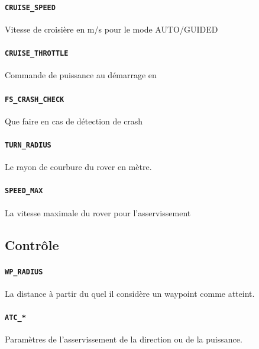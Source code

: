 \documentclass[a4paper, 10pt]{report}
\begin{document}
		\paragraph*{\texttt{CRUISE\_SPEED}} Vitesse de croisière en m/s pour le mode AUTO/GUIDED
		\paragraph*{\texttt{CRUISE\_THROTTLE}} Commande de puissance au démarrage en %
		\paragraph*{\texttt{FS\_CRASH\_CHECK}} Que faire en cas de détection de crash
		\paragraph*{\texttt{TURN\_RADIUS}}	Le rayon de courbure du rover en mètre.
		\paragraph*{\texttt{SPEED\_MAX}}	La vitesse maximale du rover pour l'asservissement
	\subsection{Contrôle}
		\paragraph*{\texttt{WP\_RADIUS}} La distance à partir du quel il considère un waypoint comme atteint.
		\paragraph*{\texttt{ATC\_*}}	Paramètres de l'asservissement de la direction ou de la puissance.
\end{document}
